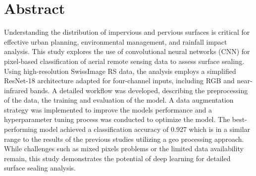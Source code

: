 

\vspace*{\fill}

\section*{Abstract}
\label{abstract}

Understanding the distribution of impervious and pervious surfaces is critical 
for effective urban planning, environmental management, and rainfall impact analysis. 
This study explores the use of convolutional neural networks (CNN) for 
pixel-based classification of aerial remote sensing data to assess surface sealing. 
Using high-resolution SwissImage RS data, the analysis employs a simplified 
ResNet-18 architecture adapted for four-channel inputs, including RGB and 
near-infrared bands. A detailed workflow was developed, describing the 
preprocessing of the data, the training and evaluation of the model.
A data augmentation strategy was implemented to improve the models performance
and a hyperparameter tuning process was conducted to optimize the model.
The best-performing model achieved a classification accuracy of 0.927 
which is in a similar range to the results of the previous studies
utilizing a geo processing approach. While challenges such as mixed pixels
problems or the limited data availability remain, this study demonstrates
the potential of deep learning for detailed surface sealing analysis.

\vspace*{\fill}